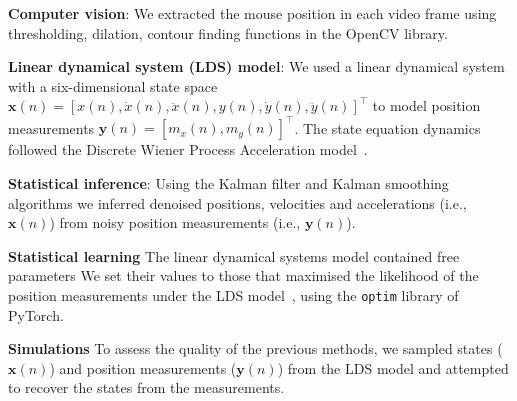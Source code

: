 
\noindent\textbf{Computer vision}: 
%
We extracted the mouse position in each video frame using thresholding,
dilation, contour finding functions in the OpenCV library.

\noindent\textbf{Linear dynamical system (LDS) model}:
%
We used a linear dynamical system with a six-dimensional state space
$\mathbf{x}(n)=[x(n), \dot{x}(n), \ddot{x}(n), y(n), \dot{y}(n),
\ddot{y}(n)]^\intercal$ to model position measurements $\mathbf{y}(n)=[m_x(n),
m_y(n)]^\intercal$.  The state equation dynamics followed the Discrete Wiener
Process Acceleration model~\cite{c1}.

\noindent\textbf{Statistical inference}:
%
Using the Kalman filter and Kalman smoothing algorithms\cite{c2} we
inferred denoised positions, velocities and accelerations (i.e., $\mathbf{x}(n)$)
from noisy position measurements (i.e., $\mathbf{y}(n)$).

\noindent\textbf{Statistical learning}
%
The linear dynamical systems model contained free parameters We set their values
to those that maximised the likelihood of the position measurements under the
LDS model~\cite{c2}, using the \texttt{optim} library of PyTorch.

\noindent\textbf{Simulations}
%
To assess the quality of the previous methods, we sampled states
($\mathbf{x}(n)$) and position measurements ($\mathbf{y}(n)$) from the LDS
model and attempted to recover the states from the measurements.
